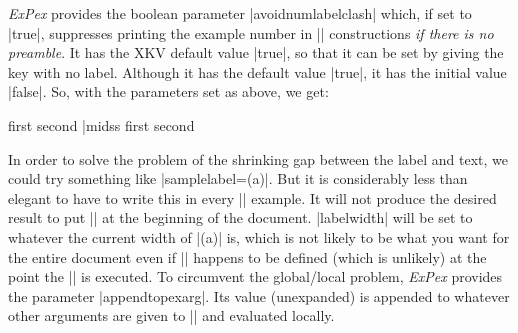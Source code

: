 {\it ExPex\/} provides the boolean parameter |avoidnumlabelclash|
which, if set to |true|, suppresses printing the example number
in |\pex| constructions {\it if there is no preamble}.  It has
the XKV default value |true|, so that it can be set by giving the
key with no label.  Although it has the default value |true|, it
has the initial value |false|.  So, with the parameters set as
above, we get:

\beginss
\pex[exno=5,avoidnumlabelclash]
\a first
\a second
\xe|midss
\pex[exno=5,avoidnumlabelclash]
\a first
\a second
\xe
\endss

In order to solve the problem of the shrinking gap between the
label and text, we could try something like
|samplelabel=(\actualexno a)|. But it is considerably less than
elegant to have to write this in every |\pex| example.  It will
not produce the desired result to put
|| at the beginning of the
document.  |labelwidth| will be set to whatever the current width
of |(\actualexno a)| is, which is not likely to be what you want
for the entire document even if |\actualexno| happens to be
defined (which is unlikely) at the point the |\lingset| is
executed.  To circumvent the global/local problem, {\it ExPex\/}
provides the parameter |appendtopexarg|.  Its value (unexpanded)
is appended to whatever other arguments are given to
|\pex| and evaluated locally.
\codedisplay

